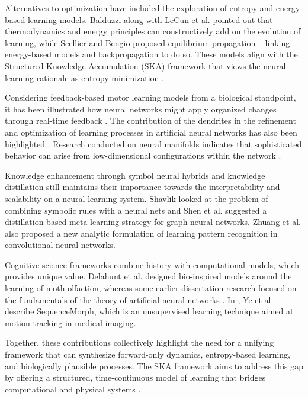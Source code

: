 \documentclass{article}
\begin{document}
Alternatives to optimization have included the exploration of entropy and energy-based learning models. Balduzzi \cite{balduzzi2017mechanistic} along with LeCun et al. \cite{lecun2006tutorial} pointed out that thermodynamics and energy principles can constructively add on the evolution of learning, while Scellier and Bengio \cite{scellier2017equilibrium} proposed equilibrium propagation – linking energy-based models and backpropagation to do so. These models align with the Structured Knowledge Accumulation (SKA) framework that views the neural learning rationale as entropy minimization \cite{mahi2025ska}.

Considering feedback-based motor learning models from a biological standpoint, it has been illustrated how neural networks might apply organized changes through real-time feedback \cite{feulner2025}. The contribution of the dendrites in the refinement and optimization of learning processes in artificial neural networks has also been highlighted \cite{chavlis2025}. Research conducted on neural manifolds indicates that sophisticated behavior can arise from low-dimensional configurations within the network \cite{gallego2017neural}.

Knowledge enhancement through symbol neural hybrids and knowledge distillation still maintains their importance towards the interpretability and scalability on a neural learning system. Shavlik \cite{shavlik1994} looked at the problem of combining symbolic rules with a neural nets and Shen et al. \cite{shen2025} suggested a distillation based meta learning strategy for graph neural networks. Zhuang et al. \cite{zhuang2025} also proposed a new analytic formulation of learning pattern recognition in convolutional neural networks.

Cognitive science frameworks combine history with computational models, which provides unique value. Delahunt et al. \cite{2} designed bio-inspired models around the learning of moth olfaction, whereas some earlier dissertation research focused on the fundamentals of the theory of artificial neural networks \cite{3}. In \cite{1}, Ye et al. describe SequenceMorph, which is an unsupervised learning technique aimed at motion tracking in medical imaging.

Together, these contributions collectively highlight the need for a unifying framework that can synthesize forward-only dynamics, entropy-based learning, and biologically plausible processes. The SKA framework aims to address this gap by offering a structured, time-continuous model of learning that bridges computational and physical systems \cite{mahi2025ska}.
\end{document}

